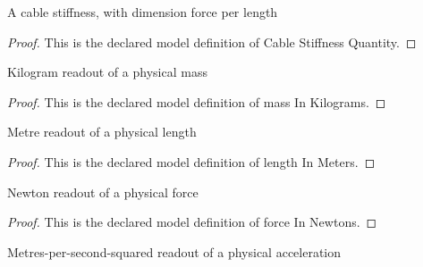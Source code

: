 \begin{definition}
  \label{def:physics:phyx-mini-0271:phyxminiproblems-problemphyxmini0271-cablestiffnessquantity}
  A cable stiffness, with dimension force per length
\end{definition}
\begin{proof}
  This is the declared model definition of Cable Stiffness Quantity.
\end{proof}
\begin{definition}
  \label{def:physics:phyx-mini-0271:phyxminiproblems-problemphyxmini0271-massinkilograms}
  Kilogram readout of a physical mass
\end{definition}
\begin{proof}
  This is the declared model definition of mass In Kilograms.
\end{proof}
\begin{definition}
  \label{def:physics:phyx-mini-0271:phyxminiproblems-problemphyxmini0271-lengthinmeters}
  Metre readout of a physical length
\end{definition}
\begin{proof}
  This is the declared model definition of length In Meters.
\end{proof}
\begin{definition}
  \label{def:physics:phyx-mini-0271:phyxminiproblems-problemphyxmini0271-forceinnewtons}
  Newton readout of a physical force
\end{definition}
\begin{proof}
  This is the declared model definition of force In Newtons.
\end{proof}
\begin{definition}
  \label{def:physics:phyx-mini-0271:phyxminiproblems-problemphyxmini0271-accelerationinmeterspersecondsquared}
  Metres-per-second-squared readout of a physical acceleration
\end{definition}
